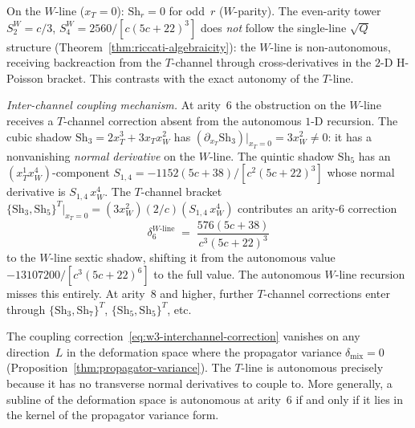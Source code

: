 \begin{remark}
\label{rem:w3-w-line}
\label{rem:w3-interchannel-coupling}
On the $W$-line ($x_T = 0$): $\mathrm{Sh}_r = 0$ for odd~$r$ ($W$-parity).  The even-arity tower $S_2^W = c/3$, $S_4^W = 2560/[c(5c{+}22)^3]$ does \emph{not} follow the single-line $\sqrt{Q}$ structure (Theorem~\ref{thm:riccati-algebraicity}): the $W$-line is non-autonomous, receiving backreaction from the $T$-channel through cross-derivatives in the $2$-D H-Poisson bracket.  This contrasts with the exact autonomy of the $T$-line.

\medskip\noindent\emph{Inter-channel coupling mechanism.}\;
At arity~$6$ the obstruction on the $W$-line receives a $T$-channel correction
absent from the autonomous $1$-D recursion.
The cubic shadow $\mathrm{Sh}_3 = 2x_T^3 + 3x_T x_W^2$ has
$(\partial_{x_T} \mathrm{Sh}_3)|_{x_T = 0} = 3 x_W^2 \neq 0$:
it has a nonvanishing \emph{normal derivative} on the $W$-line.
The quintic shadow $\mathrm{Sh}_5$ has an $(x_T^1 x_W^4)$-component
$S_{1,4} = -1152(5c{+}38)/[c^2(5c{+}22)^3]$ whose normal derivative
is $S_{1,4}\,x_W^4$.  The $T$-channel bracket
$\{\mathrm{Sh}_3,\mathrm{Sh}_5\}^T|_{x_T = 0} = (3x_W^2)(2/c)(S_{1,4}\,x_W^4)$
contributes an arity-$6$ correction
\begin{equation}
\label{eq:w3-interchannel-correction}
  \delta_6^{W\text{-line}}
  \;=\;
  \frac{576(5c+38)}{c^3(5c+22)^3}
\end{equation}
to the $W$-line sextic shadow, shifting it from the autonomous value $-13107200/[c^3(5c{+}22)^6]$ to the full value.  The autonomous $W$-line recursion misses this entirely.  At arity~$8$ and higher, further $T$-channel corrections enter through $\{\mathrm{Sh}_3, \mathrm{Sh}_7\}^T$, $\{\mathrm{Sh}_5, \mathrm{Sh}_5\}^T$, etc.

The coupling correction~\eqref{eq:w3-interchannel-correction} vanishes on any direction~$L$ in the deformation space where the propagator variance $\delta_{\mathrm{mix}} = 0$ (Proposition~\ref{thm:propagator-variance}).  The $T$-line is autonomous precisely because it has no transverse normal derivatives to couple to.  More generally, a subline of the deformation space is autonomous at arity~$6$ if and only if it lies in the kernel of the propagator variance form.
\end{remark}

